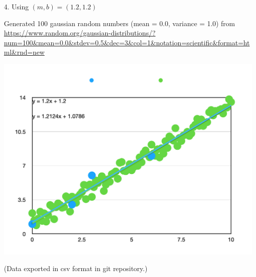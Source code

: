 \documentclass[12pt,letterpaper]{hmcpset}
\begin{document}
\begin{solution}
\newpage

4. Using $(m,b) = (1.2, 1.2)$

Generated 100 gaussian random numbers (mean = 0.0, variance = 1.0) from \url{https://www.random.org/gaussian-distributions/?num=100&mean=0.0&stdev=0.5&dec=3&col=1&notation=scientific&format=html&rnd=new}

\includegraphics[scale=0.4]{hw1-p2-graph2.png}

(Data exported in csv format in git repository.)


    \vfill
\end{solution}
\newpage
\end{document}

